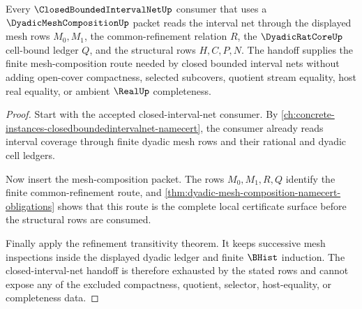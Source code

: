 \begin{theorem}
\label{thm:dyadic-mesh-composition-closed-interval-net-handoff}
Every $\ClosedBoundedIntervalNetUp$ consumer that uses a $\DyadicMeshCompositionUp$ packet reads the interval net through the displayed mesh rows $M_0,M_1$, the common-refinement relation $R$, the $\DyadicRatCoreUp$ cell-bound ledger $Q$, and the structural rows $H,C,P,N$. The handoff supplies the finite mesh-composition route needed by closed bounded interval nets without adding open-cover compactness, selected subcovers, quotient stream equality, host real equality, or ambient $\RealUp$ completeness.
\end{theorem}
\begin{proof}
Start with the accepted closed-interval-net consumer. By \autoref{ch:concrete-instances-closedboundedintervalnet-namecert}, the consumer already reads interval coverage through finite dyadic mesh rows and their rational and dyadic cell ledgers.

Now insert the mesh-composition packet. The rows $M_0,M_1,R,Q$ identify the finite common-refinement route, and \autoref{thm:dyadic-mesh-composition-namecert-obligations} shows that this route is the complete local certificate surface before the structural rows are consumed.

Finally apply the refinement transitivity theorem. It keeps successive mesh inspections inside the displayed dyadic ledger and finite $\BHist$ induction. The closed-interval-net handoff is therefore exhausted by the stated rows and cannot expose any of the excluded compactness, quotient, selector, host-equality, or completeness data.
\end{proof}


\begin{closurestatus}{\DyadicMeshCompositionUp}
  \theoryclosure{\seedClosure}
  \formalstatus{\unformalizedV}
\end{closurestatus}
